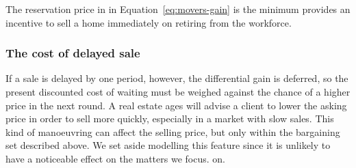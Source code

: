 The reservation price in in Equation~\ref {eq:movers-gain} is the minimum provides an incentive to sell a home immediately on retiring from the workforce. 


\subsubsection{The cost of delayed sale}
 If a sale is delayed by one period, however, the differential gain is deferred, so the present discounted cost of waiting must be weighed against the chance of a higher price in the next round. %
A real estate ages will advise a client to lower the asking price in order to sell more quickly, especially in a market with slow sales. This kind of manoeuvring can affect the selling price, but only within the bargaining set described above. We set aside modelling this feature since it is unlikely to have a noticeable  effect on the matters we  focus.  on. 










 
   
